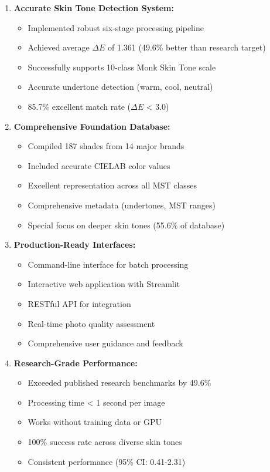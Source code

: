 \begin{enumerate}
    \item \textbf{Accurate Skin Tone Detection System:}
    \begin{itemize}
        \item Implemented robust six-stage processing pipeline
        \item Achieved average $\Delta E$ of 1.361 (49.6\% better than research target)
        \item Successfully supports 10-class Monk Skin Tone scale
        \item Accurate undertone detection (warm, cool, neutral)
        \item 85.7\% excellent match rate ($\Delta E$ < 3.0)
    \end{itemize}
    
    \item \textbf{Comprehensive Foundation Database:}
    \begin{itemize}
        \item Compiled 187 shades from 14 major brands
        \item Included accurate CIELAB color values
        \item Excellent representation across all MST classes
        \item Comprehensive metadata (undertones, MST ranges)
        \item Special focus on deeper skin tones (55.6\% of database)
    \end{itemize}
    
    \item \textbf{Production-Ready Interfaces:}
    \begin{itemize}
        \item Command-line interface for batch processing
        \item Interactive web application with Streamlit
        \item RESTful API for integration
        \item Real-time photo quality assessment
        \item Comprehensive user guidance and feedback
    \end{itemize}
    
    \item \textbf{Research-Grade Performance:}
    \begin{itemize}
        \item Exceeded published research benchmarks by 49.6\%
        \item Processing time < 1 second per image
        \item Works without training data or GPU
        \item 100\% success rate across diverse skin tones
        \item Consistent performance (95\% CI: 0.41-2.31)
    \end{itemize}
\end{enumerate}

